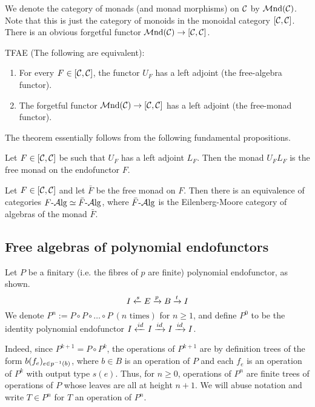 We denote the category of monads (and monad morphisms) on $\mathcal{C}$ by ${\mathrm{\mathcal{M} nd}}(\mathcal{C})$.
Note that this is just the category of monoids in the monoidal category $\left[\mathcal{C},\mathcal{C}\right]$. There is an obvious forgetful functor ${\mathrm{\mathcal{M} nd}}(\mathcal{C}) \to \left[\mathcal{C},\mathcal{C}\right]$.

\begin{theorem} \label{thm:free-monad} TFAE (The following are equivalent):
  \begin{enumerate}
  \item For every $F\in[\mathcal{C},\mathcal{C}]$, the functor $U_F$ has a left adjoint (the
    free-algebra functor).
  \item The forgetful functor ${\mathrm{\mathcal{M} nd}}(\mathcal{C})\to[\mathcal{C},\mathcal{C}]$ has a left adjoint (the
    free-monad functor).
  \end{enumerate}
\end{theorem}

The theorem essentially follows from the following fundamental propositions.
\begin{proposition}
    Let $F\in\left[\mathcal{C},\mathcal{C}\right]$ be such that $U_F$ has a left adjoint $L_F$. Then the
    monad $U_FL_F$ is the free monad on the endofunctor $F$.
\end{proposition}

\begin{proposition}
  Let $F\in\left[\mathcal{C},\mathcal{C}\right]$ and let $\bar{F}$ be the free monad on $F$. Then there
  is an equivalence of categories $F{\text{-} \mathrm{\mathcal{A} lg}}\simeq\bar{F}{\text{-} \mathrm{\mathcal{A} lg}}$, where $\bar{F}{\text{-} \mathrm{\mathcal{A} lg}}$
  is the Eilenberg-Moore category of algebras of the monad $\bar{F}$.
\end{proposition}
\subsection{Free algebras of polynomial endofunctors}
Let $P$ be a finitary (i.e. the fibres of $p$ are finite) polynomial
endofunctor, as shown.
\[
  I\xleftarrow {s} E\xrightarrow {p} B\xrightarrow {t} I
\]
We denote $P^n:=P\circ P\circ\ldots\circ P \ (n \text{ times})$ for $n \geq 1$,
and define $P^0$ to be the identity polynomial endofunctor $I\xleftarrow {id} I \xrightarrow {id}
I \xrightarrow {id} I$.

Indeed, since $P^{k+1} = P \circ P^k$, the operations of $P^{k+1}$ are by
definition trees of the form $b(f_e)_{e\in p^{-1}(b)}$, where $b\in B$ is an
operation of $P$ and each $f_e$ is an operation of $P^k$ with output type
$s(e)$. Thus, for $n\geq 0$, operations of $P^n$ are finite trees of operations
of $P$ whose leaves are all at height $n+1$. We will abuse notation and write
$T\in P^n$ for $T$ an operation of $P^n$.


